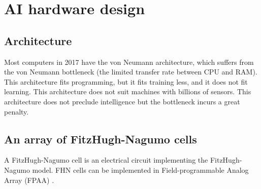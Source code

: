 \chapter{AI hardware design}

\section{Architecture}

Most computers in 2017 have the von Neumann architecture,
which suffers from the von Neumann bottleneck
(the limited transfer rate between CPU and RAM).
This architecture fits programming,
but it fits training less,
and it does not fit learning.
This architecture does not suit machines with billions of sensors.
This architecture does not preclude intelligence
but the bottleneck incurs a great penalty.

\section{An array of FitzHugh-Nagumo cells}

A FitzHugh-Nagumo cell is an electrical circuit implementing the FitzHugh-Nagumo model.
FHN cells can be implemented in Field-programmable Analog Array (FPAA) \cite{CircuitFitzHughNagumo}.
